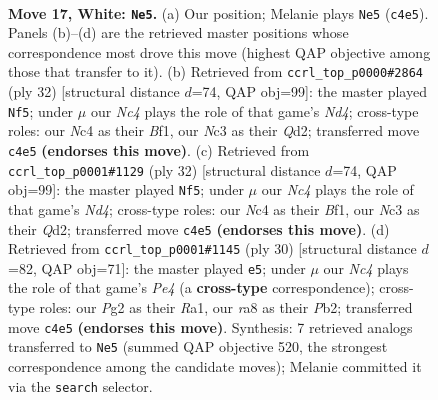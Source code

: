 \documentclass[11pt]{article}
\begin{document}
\clearpage

\begin{figure}[p]\centering
\begin{subfigure}{0.46\textwidth}\centering
\resizebox{\linewidth}{!}{%
\newchessgame
\chessboard[
  setfen={rnbqk2r/5p2/1p2pbp1/p7/P1NP4/1BN4P/1P3PP1/R2Q1RK1 w q - 0 17},
  showmover=false,
  pgfstyle=straightmove, color=movearrow, markmove={c4-e5}
]}
\caption{}
\end{subfigure}\hfill
\begin{subfigure}{0.46\textwidth}\centering
\resizebox{\linewidth}{!}{%
\newchessgame
\chessboard[
  setfen={2rqk2r/3nbppp/p3p3/1p1b2P1/3N3P/P3BP1R/1PPQ4/2KR1B2 w k - 0 17},
  showmover=false,
  pgfstyle=straightmove, color=movearrow, markmove={d4-f5}
]}
\caption{}
\end{subfigure}
\\[4pt]
\begin{subfigure}{0.46\textwidth}\centering
\resizebox{\linewidth}{!}{%
\newchessgame
\chessboard[
  setfen={2rqk2r/3nbppp/p3p3/1p1b2P1/3N3P/P3BP1R/1PPQ4/2KR1B2 w k - 0 17},
  showmover=false,
  pgfstyle=straightmove, color=movearrow, markmove={d4-f5}
]}
\caption{}
\end{subfigure}\hfill
\begin{subfigure}{0.46\textwidth}\centering
\resizebox{\linewidth}{!}{%
\newchessgame
\chessboard[
  setfen={r1bq1rk1/p4p2/2p1pb2/6p1/1ppPP3/2N5/PP2B1PP/R2Q1RK1 w - - 0 16},
  showmover=false,
  pgfstyle=straightmove, color=movearrow, markmove={e4-e5}
]}
\caption{}
\end{subfigure}
\caption{\textbf{Move 17, White: \texttt{Ne5}.} (a) Our position; Melanie plays \texttt{Ne5} (\texttt{c4e5}). Panels (b)--(d) are the retrieved master positions whose correspondence most drove this move (highest QAP objective among those that transfer to it). (b) Retrieved from \texttt{ccrl\_top\_p0000\#2864} (ply 32) [structural distance $d$=74, QAP obj=99]: the master played \texttt{Nf5}; under $\mu$ our \emph{Nc4} plays the role of that game's \emph{Nd4}; cross-type roles: our \emph{N}c4 as their \emph{B}f1, our \emph{N}c3 as their \emph{Q}d2; transferred move \texttt{c4e5} \textbf{(endorses this move)}. (c) Retrieved from \texttt{ccrl\_top\_p0001\#1129} (ply 32) [structural distance $d$=74, QAP obj=99]: the master played \texttt{Nf5}; under $\mu$ our \emph{Nc4} plays the role of that game's \emph{Nd4}; cross-type roles: our \emph{N}c4 as their \emph{B}f1, our \emph{N}c3 as their \emph{Q}d2; transferred move \texttt{c4e5} \textbf{(endorses this move)}. (d) Retrieved from \texttt{ccrl\_top\_p0001\#1145} (ply 30) [structural distance $d$=82, QAP obj=71]: the master played \texttt{e5}; under $\mu$ our \emph{Nc4} plays the role of that game's \emph{Pe4} (a \textbf{cross-type} correspondence); cross-type roles: our \emph{P}g2 as their \emph{R}a1, our \emph{r}a8 as their \emph{P}b2; transferred move \texttt{c4e5} \textbf{(endorses this move)}. Synthesis: 7 retrieved analogs transferred to \texttt{Ne5} (summed QAP objective 520, the strongest correspondence among the candidate moves); Melanie committed it via the \texttt{search} selector.}
\label{fig:thought-m32}
\end{figure}
\end{document}
